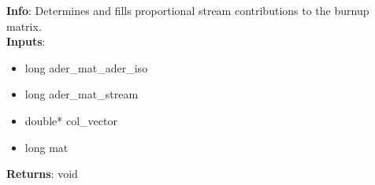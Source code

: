 \textbf{Info}: Determines and fills proportional stream contributions to the
burnup matrix. \\

\noindent \textbf{Inputs}:
\begin{itemize}
\item{long ader\_mat\_ader\_iso}
\item{long ader\_mat\_stream}
\item{double* col\_vector}
\item{long mat}
\end{itemize}

\noindent \textbf{Returns}: void
